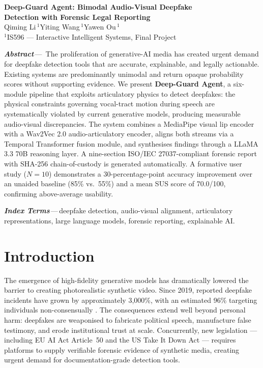 \documentclass[12pt]{article}
\begin{document}
\begin{center}
  {\Large\bfseries Deep-Guard Agent: Bimodal Audio-Visual Deepfake\\[2pt]
  Detection with Forensic Legal Reporting}\\[10pt]
  {\normalsize
    Qiming Li\,$^{1}$\quad Yiting Wang\,$^{1}$\quad Yawen Ou\,$^{1}$}\\[3pt]
  {\small $^{1}$IS596 --- Interactive Intelligent Systems, Final Project}
\end{center}

\medskip

\noindent\textbf{\textit{Abstract}}\,---\,
The proliferation of generative-AI media has created urgent demand for deepfake
detection tools that are accurate, explainable, and legally actionable.
Existing systems are predominantly unimodal and return opaque probability scores
without supporting evidence.
We present \textbf{Deep-Guard Agent}, a six-module pipeline that exploits
articulatory physics to detect deepfakes: the physical constraints governing
vocal-tract motion during speech are systematically violated by current
generative models, producing measurable audio-visual discrepancies.
The system combines a MediaPipe visual lip encoder with a Wav2Vec 2.0
audio-articulatory encoder, aligns both streams via a Temporal Transformer
fusion module, and synthesises findings through a LLaMA 3.3 70B reasoning layer.
A nine-section ISO/IEC 27037-compliant forensic report with SHA-256
chain-of-custody is generated automatically.
A formative user study ($N\!=\!10$) demonstrates a 30-percentage-point accuracy
improvement over an unaided baseline (85\% vs.\ 55\%) and a mean SUS score of
70.0/100, confirming above-average usability.

\smallskip
\noindent\textbf{\textit{Index Terms}}\,---\,deepfake detection,
audio-visual alignment, articulatory representations, large language models,
forensic reporting, explainable AI.

\medskip

\section{Introduction}

The emergence of high-fidelity generative models has dramatically lowered the
barrier to creating photorealistic synthetic video.
Since 2019, reported deepfake incidents have grown by approximately 3{,}000\%,
with an estimated 96\% targeting individuals non-consensually
\citep{sensity2023}.
The consequences extend well beyond personal harm: deepfakes are weaponised to
fabricate political speech, manufacture false testimony, and erode institutional
trust at scale.
Concurrently, new legislation --- including EU AI Act Article~50
\citep{euaiact2024} and the US Take It Down Act \citep{takedown2025} ---
requires platforms to supply verifiable forensic evidence of synthetic media,
creating urgent demand for documentation-grade detection tools.
\end{document}
